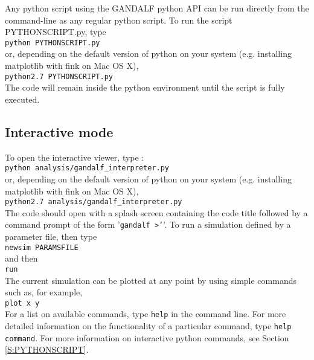 \documentclass[a4paper]{article}
\newcommand{\var}[1]{\texttt{#1}}
\begin{document}
\noindent Any python script using the GANDALF python API can be run directly from the command-line as any regular python script.  To run the script PYTHONSCRIPT.py, type \\
\newline
\var{python PYTHONSCRIPT.py} \\
\newline
or, depending on the default version of python on your system (e.g. installing matplotlib with fink on Mac OS X), \\
\newline
\var{python2.7 PYTHONSCRIPT.py} \\
\newline
The code will remain inside the python environment until the script is fully executed.



\subsection{Interactive mode}

\noindent To open the interactive viewer, type : \\
\newline
\var{python analysis/gandalf\_interpreter.py} \\
\newline
or, depending on the default version of python on your system (e.g. installing matplotlib with fink on Mac OS X), \\
\newline
\var{python2.7 analysis/gandalf\_interpreter.py} \\
\newline
\noindent The code should open with a splash screen containing the code title followed by a command prompt of the form '\var{gandalf >'}'.  To run a simulation defined by a parameter file, then type \\
\newline
\var{newsim PARAMSFILE} \\
\newline
\noindent and then \\
\newline
\var{run} \\
\newline
\noindent The current simulation can be plotted at any point by using simple commands such as, for example, \\
\newline
\var{plot x y} \\
\newline
\noindent For a list on available commands, type \var{help} in the command line.  For more detailed information on the functionality of a particular command, type \var{help command}.  For more information on interactive python commands, see Section \ref{S:PYTHONSCRIPT}.
\end{document}
